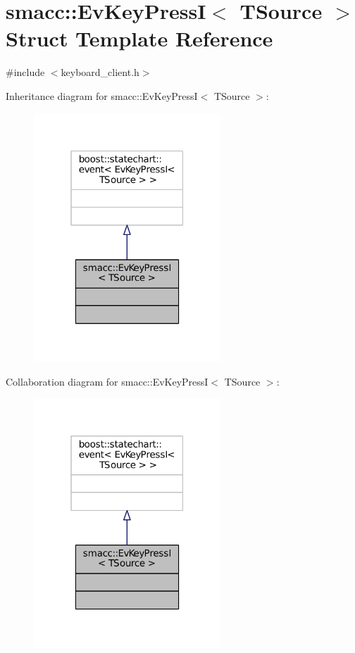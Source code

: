 \hypertarget{structsmacc_1_1EvKeyPressI}{}\section{smacc\+:\+:Ev\+Key\+PressI$<$ T\+Source $>$ Struct Template Reference}
\label{structsmacc_1_1EvKeyPressI}


{\ttfamily \#include $<$keyboard\+\_\+client.\+h$>$}



Inheritance diagram for smacc\+:\+:Ev\+Key\+PressI$<$ T\+Source $>$\+:
\nopagebreak
\begin{figure}[H]
\begin{center}
\leavevmode
\includegraphics[width=199pt]{structsmacc_1_1EvKeyPressI__inherit__graph}
\end{center}
\end{figure}


Collaboration diagram for smacc\+:\+:Ev\+Key\+PressI$<$ T\+Source $>$\+:
\nopagebreak
\begin{figure}[H]
\begin{center}
\leavevmode
\includegraphics[width=199pt]{structsmacc_1_1EvKeyPressI__coll__graph}
\end{center}
\end{figure}


